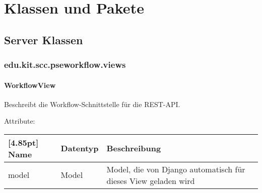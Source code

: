 \chapter{Klassen und Pakete}

	\section{Server Klassen}

	\subsection{edu.kit.scc.pseworkflow.views}

		\subsubsection{WorkflowView}
		
		Beschreibt die Workflow-Schnittstelle für die REST-API.\newline

		Attribute:
		\begin{center}
			\renewcommand{\arraystretch}{1.5}
			\setlength\tabcolsep{5pt}
			\begin{tabularx}{\textwidth}{|l|l|X|}
				\hline
				\rowcolor[gray]{0.75}[4.85pt]					
				Name & Datentyp & Beschreibung \\ \hline
				model & Model & Model, die von Django automatisch für dieses View geladen wird \\ \hline		
			\end{tabularx}
		\end{center}
		
